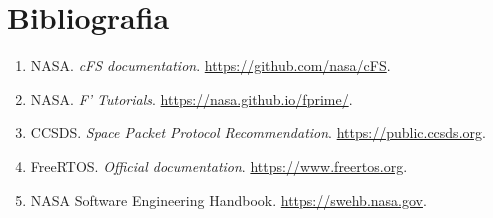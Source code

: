\documentclass[11pt,a4paper,oneside,openright]{book}
\begin{document}
\chapter*{Bibliografia}

\begin{enumerate}[leftmargin=2em]
\item NASA. \emph{cFS documentation}. \url{https://github.com/nasa/cFS}.
\item NASA. \emph{F' Tutorials}. \url{https://nasa.github.io/fprime/}.
\item CCSDS. \emph{Space Packet Protocol Recommendation}. \url{https://public.ccsds.org}.
\item FreeRTOS. \emph{Official documentation}. \url{https://www.freertos.org}.
\item NASA Software Engineering Handbook. \url{https://swehb.nasa.gov}.
\end{enumerate}
\end{document}
